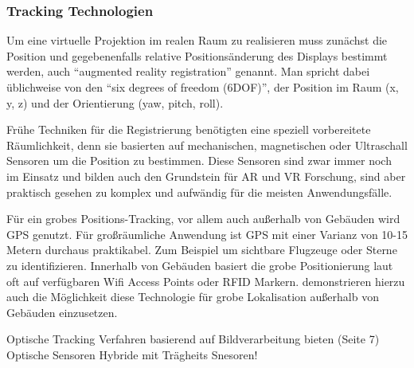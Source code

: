 \subsubsection{Tracking Technologien}

Um eine virtuelle Projektion im realen Raum zu realisieren muss zunächst die Position und gegebenenfalls relative Positionsänderung des Displays bestimmt werden, auch \enquote{augmented reality registration} genannt. Man spricht dabei üblichweise von den \enquote{six degrees of freedom (6DOF)}, der Position im Raum (x, y, z) und der Orientierung (yaw, pitch, roll). 



Frühe Techniken für die Registrierung benötigten eine speziell vorbereitete Räumlichkeit, denn sie basierten auf mechanischen, magnetischen oder Ultraschall Sensoren um die Position zu bestimmen. Diese Sensoren sind zwar immer noch im Einsatz und bilden auch den Grundstein für AR und VR Forschung, sind aber praktisch gesehen zu komplex und aufwändig für die meisten Anwendungsfälle. \citep{van2010survey} 

Für ein grobes Positions-Tracking, vor allem auch außerhalb von Gebäuden wird GPS genutzt. Für großräumliche Anwendung ist GPS mit einer Varianz von 10-15 Metern durchaus praktikabel. Zum Beispiel um sichtbare Flugzeuge oder Sterne zu identifizieren. Innerhalb von Gebäuden basiert die grobe Positionierung laut \citet{van2010survey} oft auf verfügbaren Wifi Access Points oder RFID Markern. \citet{lamarca2005place} demonstrieren hierzu auch die Möglichkeit diese Technologie für grobe Lokalisation außerhalb von Gebäuden einzusetzen.

Optische Tracking Verfahren basierend auf Bildverarbeitung bieten  (Seite 7)
Optische Sensoren
Hybride mit Trägheits Snesoren!


